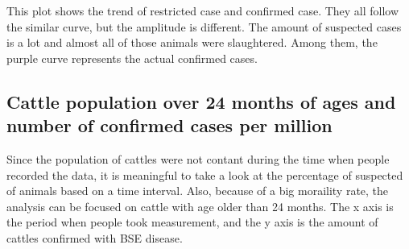 \documentclass{article}\usepackage[]{graphicx}\usepackage[]{color}
\begin{document}
This plot shows the trend of restricted case and confirmed case. They all follow the similar curve, but the amplitude is different. The amount of suspected cases is a lot and almost all of those animals were slaughtered. Among them, the purple curve represents the actual confirmed cases.

\subsection{Cattle population over 24 months of ages and number of confirmed cases per million}
Since  the population of cattles were not contant during the time when people recorded the data, it is meaningful to take a look at the percentage of suspected of animals based on a time interval. Also, because of  a big moraility rate, the analysis can be focused on cattle with age older than 24 months. The x axis is the period when people took measurement, and the y axis is the amount of cattles confirmed with BSE disease.
\end{document}
